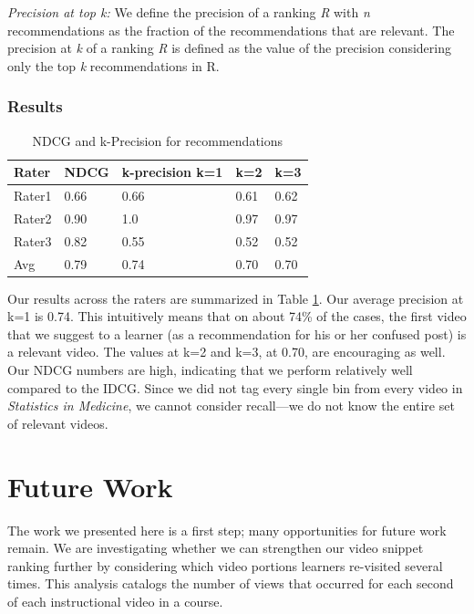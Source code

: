 \documentclass{edm_template}
\begin{document}
\textit{Precision at top k:}
We define the precision of a ranking \textit{R} with \textit{n} recommendations as the fraction of the recommendations that are relevant. The precision at \textit{k} of a ranking \textit{R} is defined as the value of the precision considering only the top \textit{k} recommendations in R. 

\subsubsection{Results}
\begin{table}
    \begin{tabular}{|l|l|l|l|l|}
    \hline
    Rater  & NDCG & k-precision k=1 & k=2  & k=3  \\ \hline
    Rater1 & 0.66 & 0.66            & 0.61 & 0.62 \\ \hline
    Rater2 & 0.90 & 1.0             & 0.97 & 0.97 \\ \hline
    Rater3 & 0.82 & 0.55            & 0.52 & 0.52 \\ \hline
    Avg    & 0.79 & 0.74            & 0.70 & 0.70 \\ \hline
    \end{tabular}
    \caption {NDCG and k-Precision for recommendations}
\label{table:ndcg}
\end{table}

Our results across the raters are summarized in Table \ref{table:ndcg}. Our average precision at k=1 is 0.74. This intuitively means that on about 74\% of the cases, the first video that we suggest to a learner (as a recommendation for his or her confused post) is a relevant video. The values at k=2 and k=3, at 0.70, are encouraging as well. Our NDCG numbers are high, indicating that we perform relatively well compared to the IDCG. Since we did not tag every single bin from every video in \emph{Statistics in Medicine}, we cannot consider recall---we do not know the entire set of relevant videos.

\section{Future Work}
\label{sec:futureWork}

The work we presented here is a first step; many opportunities for
future work remain. We are investigating whether we can
strengthen our video snippet ranking further by considering which
video portions learners re-visited several times. This analysis
catalogs the number of views that occurred for each second of each
instructional video in a course.
\end{document}
